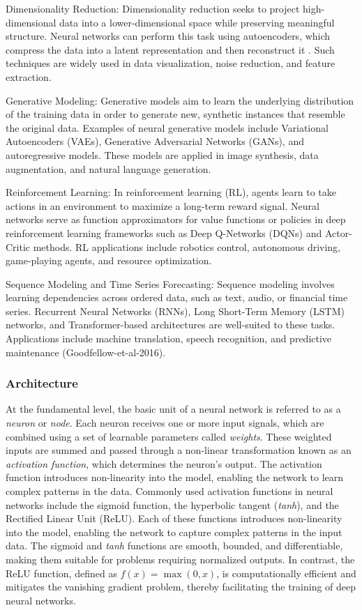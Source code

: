 Dimensionality Reduction: Dimensionality reduction seeks to project high-dimensional data into a lower-dimensional space while preserving meaningful structure. Neural networks can perform this task using autoencoders, which compress the data into a latent representation and then reconstruct it \parencite{hinton2006dimensionalityreduction}. Such techniques are widely used in data visualization, noise reduction, and feature extraction.

Generative Modeling: Generative models aim to learn the underlying distribution of the training data in order to generate new, synthetic instances that resemble the original data. Examples of neural generative models include Variational Autoencoders (VAEs), Generative Adversarial Networks (GANs), and autoregressive models. These models are applied in image synthesis, data augmentation, and natural language generation.

Reinforcement Learning: In reinforcement learning (RL), agents learn to take actions in an environment to maximize a long-term reward signal. Neural networks serve as function approximators for value functions or policies in deep reinforcement learning frameworks such as Deep Q-Networks (DQNs) and Actor-Critic methods. RL applications include robotics control, autonomous driving, game-playing agents, and resource optimization.

Sequence Modeling and Time Series Forecasting: Sequence modeling involves learning dependencies across ordered data, such as text, audio, or financial time series. Recurrent Neural Networks (RNNs), Long Short-Term Memory (LSTM) networks, and Transformer-based architectures are well-suited to these tasks. Applications include machine translation, speech recognition, and predictive maintenance (Goodfellow-et-al-2016).

\subsubsection{Architecture}
At the fundamental level, the basic unit of a neural network is referred to as a \textit{neuron} or \textit{node}. Each neuron receives one or more input signals, which are combined using a set of learnable parameters called \textit{weights}. These weighted inputs are summed and passed through a non-linear transformation known as an \textit{activation function}, which determines the neuron's output. The activation function introduces non-linearity into the model, enabling the network to learn complex patterns in the data. Commonly used activation functions in neural networks include the sigmoid function, the hyperbolic tangent (\textit{tanh}), and the Rectified Linear Unit (ReLU). Each of these functions introduces non-linearity into the model, enabling the network to capture complex patterns in the input data. The sigmoid and \textit{tanh} functions are smooth, bounded, and differentiable, making them suitable for problems requiring normalized outputs. In contrast, the ReLU function, defined as $f(x) = \max(0, x)$, is computationally efficient and mitigates the vanishing gradient problem, thereby facilitating the training of deep neural networks.

